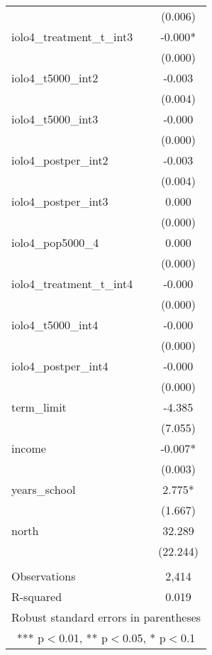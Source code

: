 \documentclass[]{article}
\begin{document}
\begin{tabular}{lc}
 & (0.006) \\
iolo4\_treatment\_t\_int3 & -0.000* \\
 & (0.000) \\
iolo4\_t5000\_int2 & -0.003 \\
 & (0.004) \\
iolo4\_t5000\_int3 & -0.000 \\
 & (0.000) \\
iolo4\_postper\_int2 & -0.003 \\
 & (0.004) \\
iolo4\_postper\_int3 & 0.000 \\
 & (0.000) \\
iolo4\_pop5000\_4 & 0.000 \\
 & (0.000) \\
iolo4\_treatment\_t\_int4 & -0.000 \\
 & (0.000) \\
iolo4\_t5000\_int4 & -0.000 \\
 & (0.000) \\
iolo4\_postper\_int4 & -0.000 \\
 & (0.000) \\
term\_limit & -4.385 \\
 & (7.055) \\
income & -0.007* \\
 & (0.003) \\
years\_school & 2.775* \\
 & (1.667) \\
north & 32.289 \\
 & (22.244) \\
 &  \\
Observations & 2,414 \\
 R-squared & 0.019 \\ \hline
\multicolumn{2}{c}{ Robust standard errors in parentheses} \\
\multicolumn{2}{c}{ *** p$<$0.01, ** p$<$0.05, * p$<$0.1} \\
\end{tabular}
\end{document}
